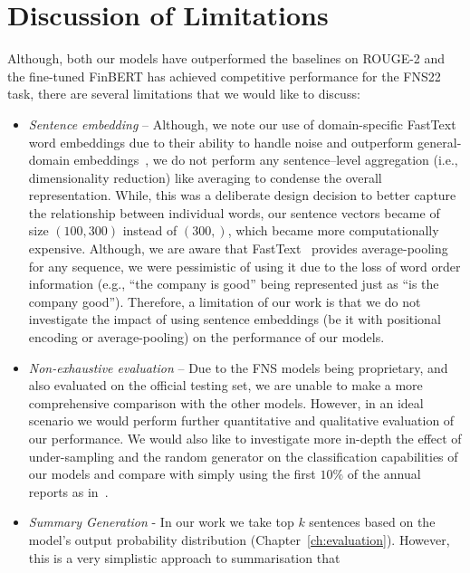 \section{Discussion of Limitations}\label{sec:limitations}
Although, both our models have outperformed the baselines on ROUGE-2 and the fine-tuned FinBERT has achieved competitive
performance for the FNS22 task, there are several limitations that we would like to discuss:
\begin{itemize}
    \item \emph{Sentence embedding} -- Although, we note our use of domain-specific FastText word embeddings due to their
    ability to handle noise and outperform general-domain embeddings~\cite{rahimikia2021realised}, we do not perform
    any sentence--level aggregation (i.e., dimensionality reduction) like averaging to condense the overall representation.
    While, this was a deliberate design decision to better capture the relationship between individual words,
    our sentence vectors became of size $(100, 300)$ instead of $(300,)$, which became more computationally expensive.
    Although, we are aware that FastText~\cite{bojanowski-etal-2017-enriching} provides average-pooling for any sequence,
    we were pessimistic of using it due to the loss of word order information (e.g., ``the company is good'' being represented just as ``is the company good'').
    Therefore, a limitation of our work is that we do not investigate the impact of using sentence embeddings
    (be it with positional encoding or average-pooling) on the performance of our models.
    \item \emph{Non-exhaustive evaluation} -- Due to the FNS models being proprietary, and also evaluated on the official testing set,
    we are unable to make a more comprehensive comparison with the other models.
    However, in an ideal scenario we would perform further quantitative and qualitative evaluation of our performance.
    We would also like to investigate more in-depth the effect of under-sampling and the random generator on the classification capabilities of our models and
    compare with simply using the first $10\%$ of the annual reports as in~\cite{orzhenovskii-2021-t5}.
    \item \emph{Summary Generation} - In our work we take top $k$ sentences based on the model's output probability distribution (Chapter~\ref{ch:evaluation}).
        However, this is a very simplistic approach to summarisation that
\end{itemize}
